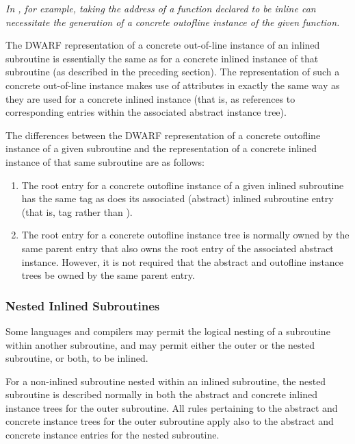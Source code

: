 \textit{In , for example, 
taking the address of a function declared
to be inline can necessitate the generation of a concrete
out\dash of\dash line instance of the given function.}

The DWARF representation of a concrete out-of-line instance
of an inlined subroutine is essentially the same as for a
concrete inlined instance of that subroutine (as described in
the preceding section). The representation of such a concrete
out-of-line 
instance 
\hypertarget{chap:DWATabstractoriginoutoflineinstance}{}
makes use of 
\DWATabstractoriginDEFN{}
attributes in exactly the same way as they are used for
a concrete inlined instance (that is, as references to
corresponding entries within the associated abstract instance
tree).

The differences between the DWARF representation of a
concrete out\dash of\dash line instance of a given subroutine and the
representation of a concrete inlined instance of that same
subroutine are as follows:
\begin{enumerate}[1. ]
\item  The root entry for a concrete out\dash of\dash line instance
of a given inlined subroutine has the same tag as does its
associated (abstract) inlined subroutine entry (that is, tag
\DWTAGsubprogram{} rather than \DWTAGinlinedsubroutine).

\item The root entry for a concrete out\dash of\dash line instance tree
is normally owned by the same parent entry that also owns
the root entry of the associated abstract instance. However,
it is not required that the abstract and out\dash of\dash line instance
trees be owned by the same parent entry.

\end{enumerate}

\subsubsection{Nested Inlined Subroutines}
\label{nestedinlinedsubroutines}
Some languages and compilers may permit the logical nesting of
a subroutine within another subroutine, and may permit either
the outer or the nested subroutine, or both, to be inlined.

For a non-inlined subroutine nested within an inlined
subroutine, the nested subroutine is described normally in
both the abstract and concrete inlined instance trees for
the outer subroutine. All rules pertaining to the abstract
and concrete instance trees for the outer subroutine apply
also to the abstract and concrete instance entries for the
nested subroutine.

